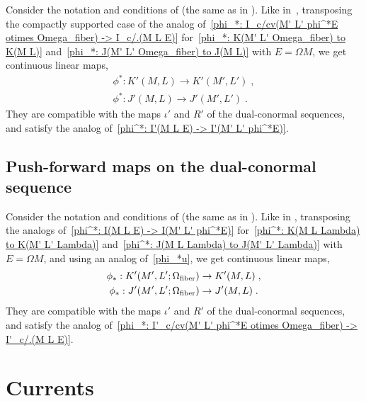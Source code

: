 \documentclass{memo-l}
\theoremstyle{plain}
\theoremstyle{definition}
\theoremstyle{remark}
\newcommand{\fiber}{{\text{\rm fiber}}}
\numberwithin{section}{chapter}
\numberwithin{equation}{section}%
\begin{document}
Consider the notation and conditions of  (the same as in ). Like in~, transposing the compactly supported case of the analog of~\eqref{phi_*: I_c/cv(M' L' phi^*E otimes Omega_fiber) -> I_c/.(M L E)} for~\eqref{phi_*: K(M' L' Omega_fiber) to K(M L)} and~\eqref{phi_*: J(M' L' Omega_fiber) to J(M L)} with $E=\Omega M$, we get continuous linear maps,
\begin{gather}
\phi^*:K'(M,L)\to K'(M',L')\;,\label{phi^*: K'(M L) to K'(M' L')}\\
\phi^*:J'(M,L)\to J'(M',L')\;.\label{phi^*: J'(M L) to J'(M' L')}
\end{gather}
They are compatible with the maps $\iota'$ and $R'$ of the dual-conormal sequences, and satisfy the analog of~\eqref{phi^*: I'(M L E) -> I'(M' L' phi^*E)}.


\subsection{Push-forward maps on the dual-conormal sequence}
\label{ss: push-forward of the dual-conormal seq}

Consider the notation and conditions of  (the same as in ). Like in , transposing the analogs of~\eqref{phi^*: I(M L E) -> I(M' L' phi^*E)} for~\eqref{phi^*: K(M L Lambda) to K(M' L' Lambda)} and~\eqref{phi^*: J(M L Lambda) to J(M' L' Lambda)} with $E=\Omega M$, and using an analog of~\eqref{phi_*u}, we get continuous linear maps,
\begin{gather}
\phi_*:K'(M',L';\Omega_\fiber)\to K'(M,L)\;,\label{phi_*: K'(M' L' Omega_fiber) to K'(M L)}\\
\phi_*:J'(M',L';\Omega_\fiber)\to J'(M,L)\;.\label{phi_*: J'(M' L' Omega_fiber) to J'(M L)}
\end{gather}
They are compatible with the maps $\iota'$ and $R'$ of the dual-conormal sequences, and satisfy the analog of~\eqref{phi_*: I'_c/cv(M' L' phi^*E otimes Omega_fiber) -> I'_c/.(M L E)}.




\section{Currents}\label{s: currents}
\end{document}
